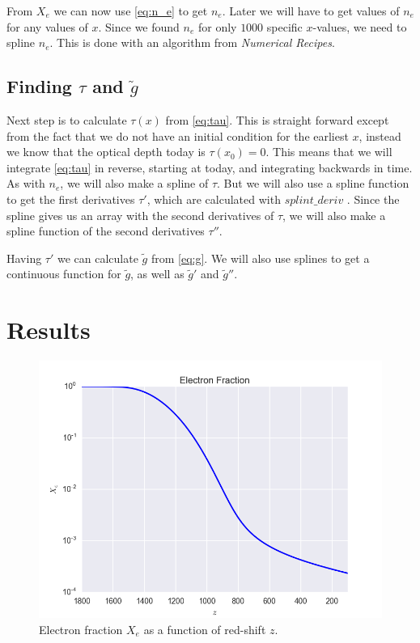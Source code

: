 \documentclass[a4paper,norsk, 10pt]{article}
\begin{document}
From $X_e$ we can now use \eqref{eq:n_e} to get $n_e$. Later we will have to get values of $n_e$ for any values of $x$. Since we found $n_e$ for only $1000$ specific $x$-values, we need to spline $n_e$. This is done with an algorithm from \textit{Numerical Recipes}. 

\subsection{Finding $\tau$ and $\tilde{g}$}

Next step is to calculate $\tau (x)$ from \eqref{eq:tau}. This is straight forward except from the fact that we do not have an initial condition for the earliest $x$, instead we know that the optical depth today is $\tau(x_0) = 0$. This means that we will integrate \eqref{eq:tau} in reverse, starting at today, and integrating backwards in time. As with $n_e$, we will also make a spline of $\tau$. But we will also use a spline function to get the first derivatives $\tau'$, which are calculated with $splint\_deriv$ . Since the spline gives us an array with the second derivatives of $\tau$, we will also make a spline function of the second derivatives $\tau''$.

Having $\tau'$ we can calculate $\tilde{g}$ from \eqref{eq:g}. We will also use splines to get a continuous function for $\tilde{g}$, as well as $\tilde{g}'$ and $\tilde{g}''$.

\section{Results}

\begin{figure}[!htb]
\centering
\includegraphics[scale=0.5]{xe.png}
\caption{Electron fraction $X_e$ as a function of red-shift $z$.}\label{fig:xe}
\end{figure}
\end{document}
